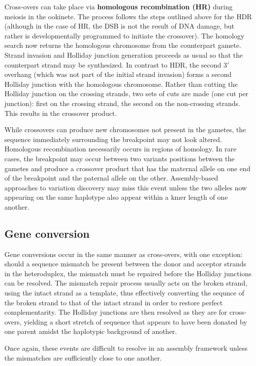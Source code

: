 Cross-overs can take place via \textbf{homologous recombination (HR)} during meiosis in the ookinete.  The process follows the steps outlined above for the HDR (although in the case of HR, the DSB is not the result of DNA damage, but rather is developmentally programmed to initiate the crossover).  The homology search now returns the homologous chromosome from the counterpart gamete.  Strand invasion and Holliday junction generation proceeds as usual so that the counterpart strand may be synthesized.  In contrast to HDR, the second $3'$ overhang (which was not part of the initial strand invasion) forms a second Holliday junction with the homologous chromosome.  Rather than cutting the Holliday junction on the crossing strands, two sets of cuts are made (one cut per junction): first on the crossing strand, the second on the non-crossing strands.  This results in the crossover product\cite{Sung:2006dk}.

While crossovers can produce new chromosomes not present in the gametes, the sequence immediately surrounding the breakpoint may not look altered.  Homologous recombination necessarily occurs in regions of homology.  In rare cases, the breakpoint may occur between two variants positions between the gametes and produce a crossover product that has the maternal allele on one end of the breakpoint and the paternal allele on the other.  Assembly-based approaches to variation discovery may miss this event unless the two alleles now appearing on the same haplotype also appear within a kmer length of one another.

\subsection{Gene conversion}

Gene conversions occur in the same manner as cross-overs, with one exception: should a sequence mismatch be present between the donor and acceptor strands in the heteroduplex, the mismatch must be repaired before the Holliday junctions can be resolved.  The mismatch repair process usually acts on the broken strand, using the intact strand as a template, thus effectively converting the sequnce of the broken strand to that of the intact strand in order to restore perfect complementarity.  The Holliday junctions are then resolved as they are for cross-overs, yielding a short stretch of sequence that appears to have been donated by one parent amidst the haplotypic background of another\cite{Chen:2007hb}.

Once again, these events are difficult to resolve in an assembly framework unless the mismatches are sufficiently close to one another.

